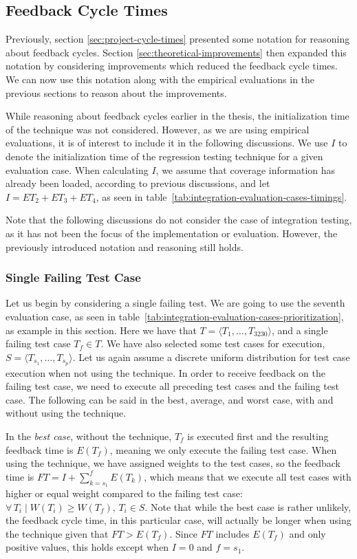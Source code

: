 \documentclass[a4paper,english,12pt]{report}
\begin{document}
\subsection{Feedback Cycle Times}\label{sec:evaluation-reduced-feedback-cycles}
Previously, section \vref{sec:project-cycle-times} presented some notation for reasoning about feedback cycles. Section \vref{sec:theoretical-improvements} then expanded this notation by considering improvements which reduced the feedback cycle times. We can now use this notation along with the empirical evaluations in the previous sections to reason about the improvements. 

While reasoning about feedback cycles earlier in the thesis, the initialization time of the technique was not considered. However, as we are using empirical evaluations, it is of interest to include it in the following discussions. We use $I$ to denote the initialization time of the regression testing technique for a given evaluation case. When calculating $I$, we assume that coverage information has already been loaded, according to previous discussions, and let $I=\mathit{ET}_2+\mathit{ET}_3+\mathit{ET}_4$, as seen in table~\vref{tab:integration-evaluation-cases-timings}.

Note that the following discussions do not consider the case of integration testing, as it has not been the focus of the implementation or evaluation. However, the previously introduced notation and reasoning still holds.

\subsubsection{Single Failing Test Case}
Let us begin by considering a single failing test. We are going to use the seventh evaluation case, as seen in table~\vref{tab:integration-evaluation-cases-prioritization}, as example in this section. Here we have that $T=\langle T_1,\ldots,T_{3230} \rangle$, and a single failing test case $T_f \in T$. We have also selected some test cases for execution, $S = \langle T_{s_1}, \ldots, T_{s_p} \rangle$. Let us again assume a discrete uniform distribution for test case execution when not using the technique. In order to receive feedback on the failing test case, we need to execute all preceding test cases and the failing test case. The following can be said in the best, average, and worst case, with and without using the technique.

In the \textit{best case}, without the technique, $T_f$ is executed first and the resulting feedback time is $E(T_f)$, meaning we only execute the failing test case. When using the technique, we have assigned weights to the test cases, so the feedback time is $\mathit{FT} = I + \sum_{k=s_1}^{f} E(T_k)$, which means that we execute all test cases with higher or equal weight compared to the failing test case: $\forall\,T_i \mid W(T_i) \geq W(T_f),\, T_i \in S$. Note that while the best case is rather unlikely, the feedback cycle time, in this particular case, will actually be longer when using the technique given that $\mathit{FT} > E(T_f)$. Since $\mathit{FT}$ includes $E(T_f)$ and only positive values, this holds except when $I=0$ and $f=s_1$.
\end{document}
